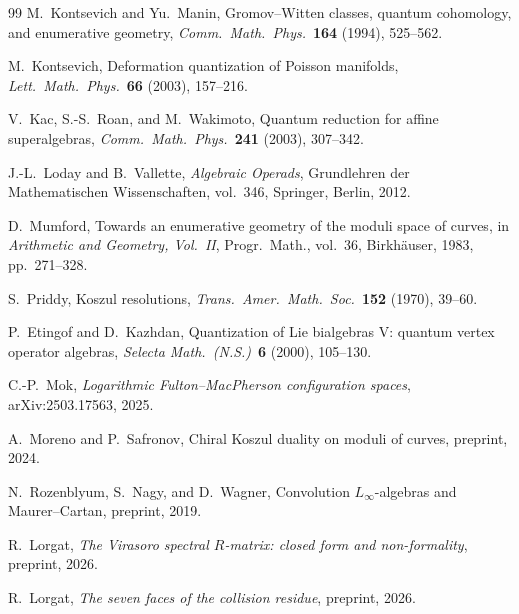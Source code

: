 \documentclass[11pt,reqno]{amsart}
\theoremstyle{definition}
\theoremstyle{remark}
\numberwithin{equation}{section}
\begin{document}
\begin{thebibliography}{99}
M.~Kontsevich and Yu.~Manin,
Gromov--Witten classes, quantum cohomology, and enumerative geometry,
\textit{Comm.\ Math.\ Phys.}~\textbf{164} (1994), 525--562.

M.~Kontsevich,
Deformation quantization of Poisson manifolds,
\textit{Lett.\ Math.\ Phys.}~\textbf{66} (2003), 157--216.

V.~Kac, S.-S.~Roan, and M.~Wakimoto,
Quantum reduction for affine superalgebras,
\textit{Comm.\ Math.\ Phys.}~\textbf{241} (2003), 307--342.

J.-L.~Loday and B.~Vallette,
\textit{Algebraic Operads},
Grundlehren der Mathematischen Wissenschaften, vol.~346,
Springer, Berlin, 2012.

D.~Mumford,
Towards an enumerative geometry of the moduli space of curves,
in \textit{Arithmetic and Geometry, Vol.~II},
Progr.\ Math., vol.~36, Birkh\"auser, 1983, pp.~271--328.

S.~Priddy,
Koszul resolutions,
\textit{Trans.\ Amer.\ Math.\ Soc.}~\textbf{152} (1970), 39--60.

P.~Etingof and D.~Kazhdan,
Quantization of Lie bialgebras V: quantum vertex operator algebras,
\textit{Selecta Math.\ (N.S.)}~\textbf{6} (2000), 105--130.

C.-P.~Mok,
\emph{Logarithmic Fulton--MacPherson configuration spaces},
arXiv:2503.17563, 2025.

A.~Moreno and P.~Safronov,
Chiral Koszul duality on moduli of curves,
preprint, 2024.

N.~Rozenblyum, S.~Nagy, and D.~Wagner,
Convolution $L_\infty$-algebras and Maurer--Cartan,
preprint, 2019.

R.~Lorgat,
\textit{The Virasoro spectral $R$-matrix: closed form and non-formality},
preprint, 2026.

R.~Lorgat,
\textit{The seven faces of the collision residue},
preprint, 2026.

\end{thebibliography}
\end{document}
